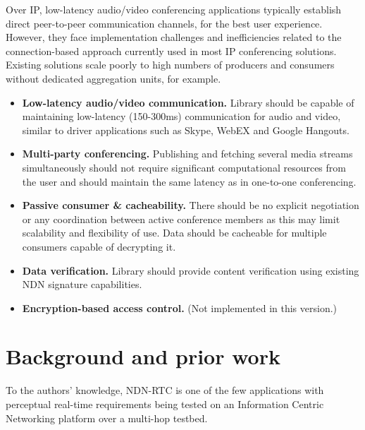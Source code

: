 \documentclass{icn/sig-alternate-2012} %
\newcommand{\ndnrtcName}{NDN-RTC} %
\begin{document}
Over IP, low-latency audio/video conferencing applications typically establish direct peer-to-peer communication channels, for the best user experience. However, they face implementation challenges and inefficiencies related to the connection-based approach currently used in most IP conferencing solutions.  Existing solutions scale poorly to high numbers of producers and consumers without dedicated aggregation units, for example. 


\begin{itemize}
\item \textbf{Low-latency audio/video communication.} Library should be capable of maintaining low-latency (150-300ms) communication for audio and video, similar to driver applications such as Skype, WebEX and Google Hangouts.

\item \textbf{Multi-party conferencing.} Publishing and fetching several media streams simultaneously should not require significant computational resources from the user and should maintain the same latency as in one-to-one conferencing.

\item \textbf{Passive consumer \& cacheability.} There should be no explicit negotiation or any coordination between active conference members as this may limit scalability and flexibility of use. Data should be cacheable for multiple consumers capable of decrypting it. 

\item \textbf{Data verification.} Library should provide content verification using existing NDN signature capabilities. 

\item \textbf{Encryption-based access control.}   (Not implemented in this version.)
\end{itemize} 


\section{Background and prior work}
\label{sec:bg}
To the authors' knowledge, \ndnrtcName{} is one of the few applications with perceptual real-time requirements being tested on an Information Centric Networking platform over a multi-hop testbed. 
\end{document}
